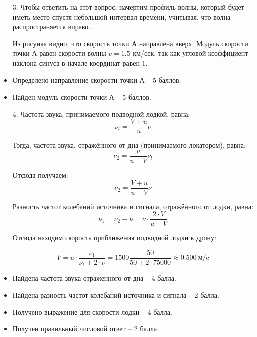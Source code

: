 \begin{enumerate}
    \item[3.] Чтобы ответить на этот вопрос, начертим профиль волны, который будет иметь место спустя небольшой интервал времени, учитывая, что волна распространяется вправо.

    Из рисунка видно, что скорость точки А направлена вверх. 
    Модуль скорости точки А равен скорости волны $v = 1.5$ км/сек, так как угловой коэффициент 
    наклона синуса в начале координат равен 1.

\end{enumerate}

\additionalCriteria

\begin{itemize}
    \item Определено направление скорости точки А  – 5 баллов.
    \item Найден модуль скорости точки А – 5 баллов.    
\end{itemize}

\begin{enumerate}
    \item[4.] Частота звука, принимаемого подводной лодкой, 
    равна:
    $$\nu_l=\frac{V+u}{u} \nu$$

    Тогда, частота звука, отражённого от дна (принимаемого локатором), равна:
    $$\nu_2=\frac{u}{u-V} \nu_l$$

    Отсюда получаем:    $$\nu_2=\frac{V+u}{u-V}  \nu$$

    Разность частот колебаний источника и сигнала, 
    отражённого от лодки, равна:
    $$\nu_1=\nu_2-\nu=\nu\cdot \frac{2\cdot V}{u-V}$$

    Отсюда находим скорость приближения подводной лодки к 
    дрону:
    
    $$V=u\cdot \frac{\nu_1}{\nu_1+2\cdot \nu}=1500 \frac{50}{50+2\cdot 75000} \approx 0.500 \: \text{м/c}$$
    
\end{enumerate}

\additionalCriteria

\begin{itemize}
    \item Найдена частота звука отраженного от дна – 4 балла.
    \item Найдена разность частот колебаний источника и сигнала – 2 балла.
    \item Получено выражение для скорости лодки – 4 балла.
    \item Получен правильный числовой ответ – 2 балла.
\end{itemize}

